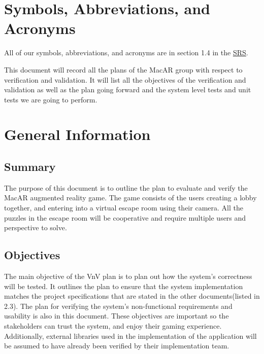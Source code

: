 \documentclass[12pt, titlepage]{article}
\begin{document}
\newpage

\tableofcontents

\listoftables

\newpage

\section{Symbols, Abbreviations, and Acronyms}

All of our symbols, abbreviations, and acronyms are in section 1.4 in the  \href{https://github.com/SammyG7/Mac-AR/blob/main/docs/SRS/SRS.pdf}{SRS}.

\newpage


This document will record all the plans of the MacAR group with respect to verification and validation. It will list all the objectives of the verification and validation as well as the plan going forward and the system level tests and unit tests we are going to perform.  

\section{General Information}

\subsection{Summary}

The purpose of this document is to outline the plan to evaluate and verify the MacAR augmented reality game. The game consists of the users creating a lobby together, and entering into a virtual escape room using their camera. All the puzzles in the escape room will be cooperative and require multiple users and perspective to solve. 

\subsection{Objectives}

The main objective of the VnV plan is to plan out how the system's correctness will be tested. It outlines the plan to ensure that the system implementation matches the project specifications that are stated in the other documents(listed in 2.3). The plan for verifying the system's non-functional requirements and usability is also in this document. These objectives are important so the stakeholders can trust the system, and enjoy their gaming experience. Additionally, external libraries used in the implementation of the application will be assumed to have already been verified by their implementation team.
\end{document}
